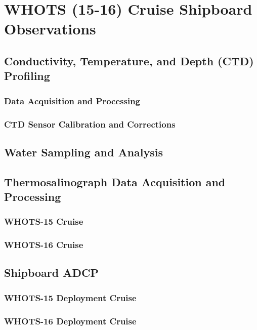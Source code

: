 \section{WHOTS (15-16) Cruise Shipboard Observations}


\subsection{Conductivity, Temperature, and Depth (CTD) Profiling}

\subsubsection{Data Acquisition and Processing}
\subsubsection{CTD Sensor Calibration and Corrections}

\subsection{Water Sampling and Analysis}

\subsection{Thermosalinograph Data Acquisition and Processing }

\subsubsection{WHOTS-15 Cruise}
\subsubsection{WHOTS-16 Cruise}

\subsection{Shipboard ADCP}

\subsubsection{WHOTS-15 Deployment Cruise}
\subsubsection{WHOTS-16 Deployment Cruise}
